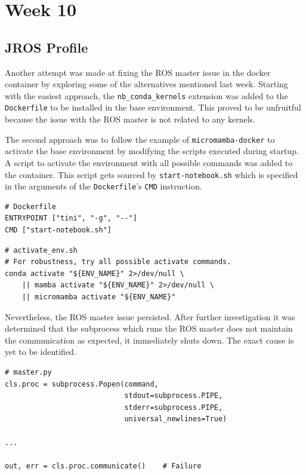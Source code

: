 \chapter{Week 10}

\section{JROS Profile}

    Another attempt was made at fixing the ROS master issue in the docker container by exploring some of the alternatives mentioned last week. Starting with the easiest approach, the \texttt{nb\_conda\_kernels} extension was added to the \texttt{Dockerfile} to be installed in the base environment. This proved to be unfruitful because the issue with the ROS master is not related to any kernels. 

    The second approach was to follow the example of \texttt{micromamba-docker} to activate the base environment by modifying the scripts executed during startup. A script to activate the environment with all possible commands was added to the container. This script gets sourced by \texttt{start-notebook.sh} which is specified in the arguments of the \texttt{Dockerfile}'s \texttt{CMD} instruction.

    \begin{lstlisting}[language=docker]
# Dockerfile
ENTRYPOINT ["tini", "-g", "--"]
CMD ["start-notebook.sh"]
    \end{lstlisting}

    \begin{lstlisting}
# activate_env.sh
# For robustness, try all possible activate commands.
conda activate "${ENV_NAME}" 2>/dev/null \
    || mamba activate "${ENV_NAME}" 2>/dev/null \
    || micromamba activate "${ENV_NAME}"
    \end{lstlisting}

    \noindent Nevertheless, the ROS master issue persisted. After further investigation it was determined that the subprocess which runs the ROS master does not maintain the communication as expected, it immediately shuts down. The exact cause is yet to be identified.

    \begin{lstlisting}
# master.py
cls.proc = subprocess.Popen(command, 
                            stdout=subprocess.PIPE, 
                            stderr=subprocess.PIPE,
                            universal_newlines=True)
                            
...

out, err = cls.proc.communicate()    # Failure
    \end{lstlisting}


